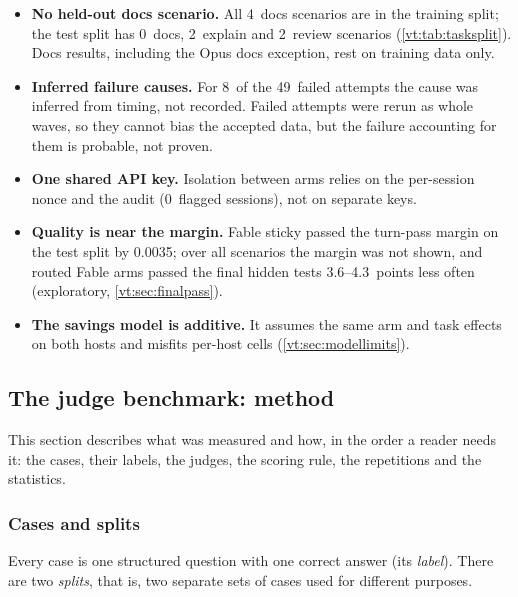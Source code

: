 \documentclass[11pt,letterpaper]{article}
\newcommand{\term}[1]{\emph{#1}}
\newcommand{\AuditFlagged}{0}
\newcommand{\FinalGapHigh}{4.3}
\newcommand{\FinalGapLow}{3.6}
\newcommand{\NFailed}{49}
\newcommand{\NFailedInferred}{8}
\newcommand{\QFableStickyMarginGap}{0.0035}
\newcommand{\RvDocsTest}{0}
\newcommand{\RvDocsTrain}{4}
\newcommand{\RvExplainTest}{2}
\newcommand{\RvReviewTest}{2}
\begin{document}
\begin{itemize}
    test scenarios. Exploratory contrasts are not corrected for multiplicity.
  \item \textbf{No held-out docs scenario.} All \RvDocsTrain\ docs scenarios are in the training split; the test
    split has \RvDocsTest\ docs, \RvExplainTest\ explain and \RvReviewTest\ review scenarios (\cref{vt:tab:tasksplit}).
    Docs results, including the Opus docs exception, rest on training data only.
  \item \textbf{Inferred failure causes.} For \NFailedInferred\ of the \NFailed\ failed attempts the cause
    was inferred from timing, not recorded. Failed attempts were rerun as whole waves, so they cannot bias
    the accepted data, but the failure accounting for them is probable, not proven.
  \item \textbf{One shared API key.} Isolation between arms relies on the per-session nonce and the audit
    (\AuditFlagged\ flagged sessions), not on separate keys.
  \item \textbf{Quality is near the margin.} Fable sticky passed the turn-pass margin on the test split by
    \QFableStickyMarginGap; over all scenarios the margin was not shown, and routed Fable arms passed the
    final hidden tests \FinalGapLow--\FinalGapHigh\ points less often (exploratory, \cref{vt:sec:finalpass}).
  \item \textbf{The savings model is additive.} It assumes the same arm and task effects on both hosts and
    misfits per-host cells (\cref{vt:sec:modellimits}).
\end{itemize}
\subsection{The judge benchmark: method}\label{jb:sec:method}

This section describes what was measured and how, in the order a reader needs it: the cases, their
labels, the judges, the scoring rule, the repetitions and the statistics.

\subsubsection{Cases and splits}

Every case is one structured question with one correct answer (its \term{label}). There are two
\term{splits}, that is, two separate sets of cases used for different purposes.
\end{document}
